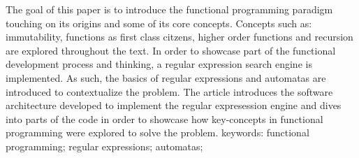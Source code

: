 The goal of this paper is to introduce the functional programming paradigm touching on its origins and some of its core concepts.
Concepts such as: immutability, functions as first class citzens, higher order functions and recursion are explored throughout the text.
In order to showcase part of the functional development process and thinking, a regular expression search engine is implemented.
As such, the basics of regular expressions and automatas are introduced to contextualize the problem.
The article introduces the software architecture developed to implement the regular expresession engine and dives into parts of the code in order to showcase how key-concepts in functional programming were explored to solve the problem.
keywords: functional programming; regular expressions; automatas;
